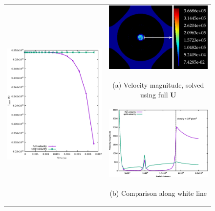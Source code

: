 \documentclass{aastex62}
\begin{document}
\begin{figure}[htb]
\begin{center}
\begin{tabular}{l c}
\multirow{4}{3.25in}[30mm]{ \includegraphics[width=3.0in]{wdconvect_256_splitU.eps} } & \multicolumn{1}{c}{\includegraphics[width=2.35in]{magvel_full_XY.eps}} \\
& \multicolumn{1}{c}{\begin{footnotesize} (a) Velocity magnitude, solved using full $\mathbf{U}$ \end{footnotesize}} \\[1.em]
& \multicolumn{1}{c}{\includegraphics[width=2.75in]{magvel_lineout_X.eps}} \\ 
& \multicolumn{1}{c}{\begin{footnotesize} (b) Comparison along white line \end{footnotesize}} \\

\end{tabular}
\end{center}
\end{figure}
\end{document}
